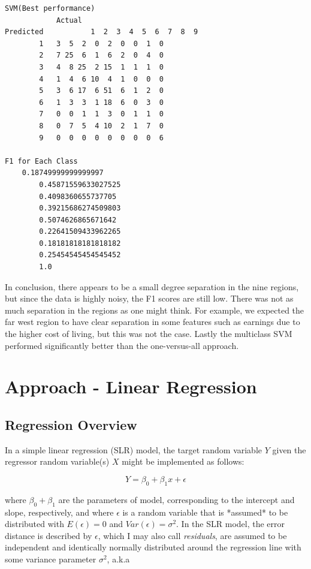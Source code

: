 \documentclass[10pt]{article}
\begin{document}
\begin{lstlisting}
SVM(Best performance)
         	Actual
Predicted   		1  2  3  4  5  6  7  8  9
		1	3  5  2  0  2  0  0  1  0
		2	7 25  6  1  6  2  0  4  0
		3	4  8 25  2 15  1  1  1  0
		4	1  4  6 10  4  1  0  0  0
		5	3  6 17  6 51  6  1  2  0
		6	1  3  3  1 18  6  0  3  0
		7	0  0  1  1  3  0  1  1  0
		8	0  7  5  4 10  2  1  7  0
		9	0  0  0  0  0  0  0  0  6

F1 for Each Class
	0.18749999999999997
        0.45871559633027525
        0.4098360655737705
        0.39215686274509803
        0.5074626865671642
        0.22641509433962265
        0.18181818181818182
        0.25454545454545452
        1.0

\end{lstlisting}

In conclusion, there appears to be a small degree separation in the nine regions, but since the data is highly noisy, the F1 scores are still low. There was not as much separation in the regions as one might think. For example, we expected the far west region to have clear separation in some features such as earnings due to the higher cost of living, but this was not the case. Lastly the multiclass SVM performed significantly better than the one-versus-all approach.

\section{Approach - Linear Regression}

\subsection{Regression Overview}
In a simple linear regression (SLR) model, the target random variable $Y$ given the regressor random variable(s) $X$ might be implemented as follows: 

$$ Y = \beta_0 + \beta_1 x + \epsilon $$

where $\beta_0 + \beta_1$ are the parameters of model, corresponding to the intercept and slope, respectively, and where $\epsilon$ is a random variable that is *assumed* to be distributed with $E(\epsilon) = 0$ and $Var(\epsilon) = \sigma^2$\cite{murphy2012machine}. In the SLR model, the error distance is described by $\epsilon$, which I may also call {\it residuals}, are assumed to be independent and identically normally distributed around the regression line with some variance parameter $\sigma^2$, a.k.a
\end{document}
